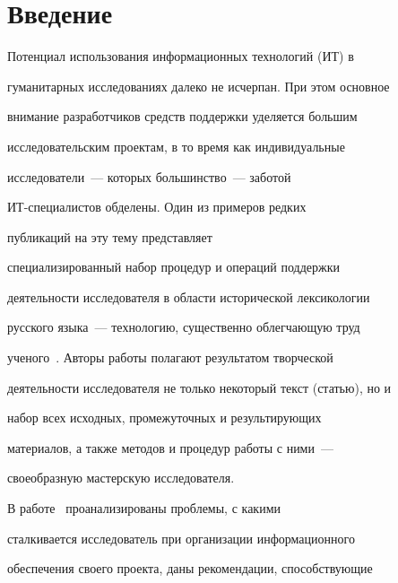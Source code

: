       


            \label{st\stat}


            


            \vspace*{-9pt}





\section{Введение}





     Потенциал использования информационных технологий (ИТ) в 


гуманитарных исследованиях далеко не исчерпан. При этом основное 


внимание разработчиков средств поддержки уделяется большим 


исследовательским проектам, в то время как индивидуальные 


исследователи~--- которых большинство~--- заботой 


     ИТ-спе\-ци\-а\-листов обделены. Один из примеров редких 


публикаций на эту тему представляет 


специализированный набор процедур и операций поддержки 


деятельности исследователя в  области исторической лексикологии 


русского языка~--- технологию, существенно облегчающую труд 


ученого~\cite{1-2-12}. Авторы работы полагают результатом творческой 


деятельности исследователя не только некоторый текст (статью), но и 


набор всех исходных, промежуточных и результирующих 


материалов, а также методов и процедур работы с ними~--- 


своеобразную мастерскую исследователя.


     


     В работе~\cite{2-2-12} проанализированы проблемы, с какими 


сталкивается исследователь при организации информационного 


обеспечения своего проекта, даны рекомендации,  способствующие 


